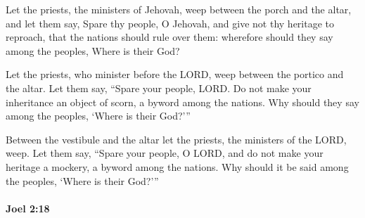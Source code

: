 			\begin{versebox}
					\item[BHS] 
					\item[LXX] 
					\item[ASV] Let the priests, the ministers of Jehovah, weep between the porch and the altar, and let them say, Spare thy people, O Jehovah, and give not thy heritage to reproach, that the nations should rule over them: wherefore should they say among the peoples, Where is their God?
					\item[NIV] Let the priests, who minister before the LORD, weep between the portico and the altar. Let them say, “Spare your people, LORD. Do not make your inheritance an object of scorn, a byword among the nations. Why should they say among the peoples, ‘Where is their God?’”
					\item[NRSV] Between the vestibule and the altar let the priests, the ministers of the LORD, weep. Let them say, “Spare your people, O LORD, and do not make your heritage a mockery, a byword among the nations. Why should it be said among the peoples, ‘Where is their God?’”
			\end{versebox}

		\paragraph{Joel 2:18} %
			\label{JOEL-2-18}

